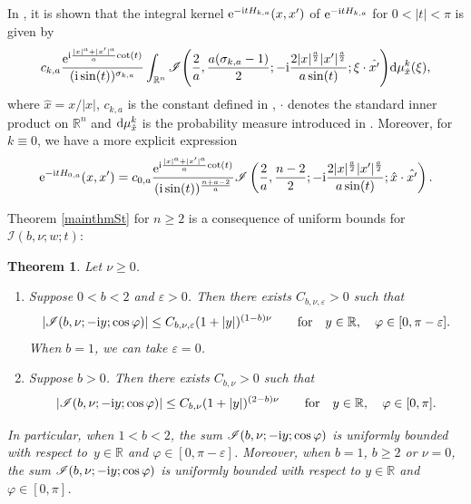 \documentclass[pdftex]{sigma}
\numberwithin{equation}{section}
\newtheorem{Theorem}{Theorem}[section]
\def\R{\mathbb{R}}%
\def\e{\varepsilon}
\def\f{\varphi}
\def\m{\mu}
\def\n{\nu}
\def\x{\xi}
\newcommand{\sI}{\mathscr{I}}
\begin{document}
In \cite[Theorem C, equations (4.50) and (4.52)]{BKO}, it is shown that the integral kernel ${\rm e}^{-{\rm i}tH_{k,a}}(x,\allowbreak x')$ of ${\rm e}^{-{\rm i}tH_{k,a}}$ for $0<|t|<\pi$ is given by
\begin{align}\label{intkergen}
c_{k,a}\frac{{\rm e}^{{\rm i}\frac{|x|^a+|x'|^a}{a}\mathrm{cot}(t)} }{({\rm i}\sin (t))^{\sigma_{k,a}}} \int_{\R^n}\sI\Bigg(\frac{2}{a},\frac{a(\sigma_{k,a}-1)}{2}; -{\rm i}\frac{2|x|^{\frac{a}{2}}|x'|^{\frac{a}{2}} }{a\sin(t)}; \x\cdot \hat{x'}\Bigg){\rm d}\m_{\hat{x}}^k(\x),
\end{align}
where $\hat{x}=x/|x|$, $c_{k,a}$ is the constant defined in \cite[equation~(1.6)]{BKO}, $\cdot $ denotes the standard inner product on $\R^n$ and ${\rm d}\m_{\hat{x}}^{k}$ is the probability measure introduced in \cite[equation~(2.5)]{BKO}. Moreover, for $k\equiv 0$, we have a more explicit expression
\begin{align}\label{intker0}
{\rm e}^{-{\rm i}tH_{0,a}}(x,x')=c_{0,a}\frac{{\rm e}^{{\rm i}\frac{|x|^a+|x'|^a}{a}\mathrm{cot}(t)} }{({\rm i}\sin (t))^{\frac{n+a-2}{a}}} \sI\left(\frac{2}{a},\frac{n-2}{2}; -{\rm i}\frac{2|x|^{\frac{a}{2}}|x'|^{\frac{a}{2}} }{a\sin(t)}; \hat{x}\cdot \hat{x'}\right).
\end{align}

Theorem \ref{mainthmSt} for $n\geq 2$ is a consequence of uniform bounds for $\sI(b,\nu;w;t)$:

\begin{Theorem}\label{keythm}
Let $\n\geq 0$.
\begin{enumerate}\itemsep=0pt
\item[$(i)$]
Suppose $0<b<2$ and $\e>0$. Then there exists $C_{b,\n,\e}>0$ such that
\begin{align*}
|\sI(b,\nu;-{\rm i}y;\cos\f)|\leq C_{b,\n,\e}(1+|y|)^{(1-b)\n}\qquad \text{for}\quad y\in \R,\quad \f\in [0,\pi-\e].
\end{align*}
When $b=1$, we can take $\e=0$.

\item[$(ii)$]
Suppose $b>0$. Then there exists $C_{b,\n}>0$ such that
\begin{align*}
|\sI(b,\nu;-{\rm i}y;\cos\f)|\leq C_{b,\n}(1+|y|)^{(2-b)\n}\qquad \text{for}\quad y\in \R,\quad \f\in [0,\pi].
\end{align*}
\end{enumerate}
In particular, when $1< b< 2$, the sum $\sI(b,\nu;-{\rm i}y;\cos\f)$ is uniformly bounded with respect to~${y\in \R}$ and $\f\in [0,\pi-\e]$. Moreover, when $b=1$, $b\geq 2$ or $\nu=0$, the sum $\sI(b,\nu;-{\rm i}y;\cos\f)$ is uniformly bounded with respect to $y\in \R$ and $\f\in [0,\pi]$.
\end{Theorem}
\end{document}
